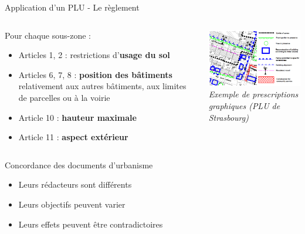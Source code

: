\documentclass[xcolor=table]{beamer}
\begin{document}
\begin{frame}{Application d'un PLU - Le règlement}
\begin{columns}[T]
\begin{column}[T]{5cm}
Pour chaque sous-zone : 
\begin{itemize}
\item Articles 1, 2 : restrictions d’\textbf{usage du sol}
\item Articles 6, 7, 8 : \textbf{position des bâtiments} relativement aux autres bâtiments, aux limites de parcelles ou à la voirie
\item Article 10 : \textbf{hauteur maximale}
\item Article 11 : \textbf{aspect extérieur}
\end{itemize}
\end{column}
\begin{column}[T]{5.5cm}
\centering
\includegraphics[width=6cm]{Images/codesplu.png}
\\
\textit{Exemple de prescriptions graphiques (PLU de Strasbourg)}
\end{column}
\end{columns}
\end{frame}

\begin{frame}{Concordance des documents d'urbanisme}
\begin{itemize}
\item Leurs rédacteurs sont différents
\item Leurs objectifs peuvent varier
\item Leurs effets peuvent être contradictoires
\end{itemize}
\end{frame}
\end{document}
